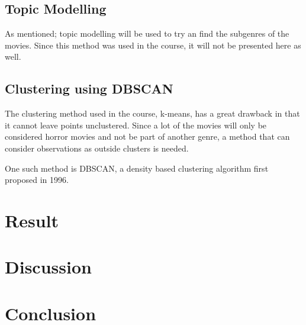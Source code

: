 \documentclass[11pt,a4paper]{article}
\begin{document}
\subsection{Topic Modelling}

As mentioned; topic modelling will be used to try an find the subgenres of the movies. Since this method was used in the course, it will not be presented here as well.

\subsection{Clustering using DBSCAN}

The clustering method used in the course, k-means, has a great drawback in that it cannot leave points unclustered. Since a lot of the movies will only be considered horror movies and not be part of another genre, a method that can consider observations as outside clusters is needed. 

One such method is DBSCAN, a density based clustering algorithm first proposed in 1996. 


\newpage


\section{Result}

\lipsum[21-25]

\newpage

\section{Discussion}

\lipsum[25-30]

\newpage

\section{Conclusion}

\lipsum[30-35]

\newpage
\end{document}
